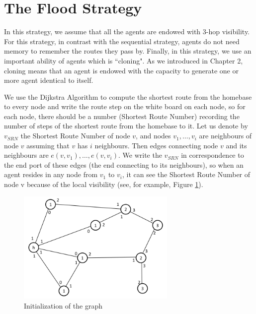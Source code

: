\section{The Flood Strategy}
In this strategy, we assume that all the agents are endowed with 3-hop visibility. For this strategy, in contrast with the sequential strategy, agents   do not need memory to remember the routes they pass by.  Finally, in this strategy, we use an important ability of agents which is ``cloning". As we introduced in Chapter 2, cloning means that an agent is endowed with the capacity to generate one or more agent identical to itself. 

We use the Dijkstra Algorithm to compute the shortest route from the homebase to every node and write the route step on the white board on each node, so for each node, there should be a number (Shortest Route Number) recording the number of steps of the shortest route from the homebase to it. Let us denote by $v_{SRN}$ the Shortest Route Number of node $v$, and nodes ${v_1, \ldots, v_i}$ are neighbours of node $v$ assuming that $v$ has $i$ neighbours. Then edges connecting node $v$ and its neighbours are $e(v, v_1), \ldots, e(v, v_i)$. We write the $v_{SRN}$ in correspondence to the   end port of these edges (the end connecting to its neighbours), so when an agent resides in any node from $v_1$ to $v_i$, it can see the Shortest Route Number of node v because of the local visibility (see, for example,   Figure \ref{fig:Arbi1}).

\begin{figure}[H]
  \centering  
  \includegraphics[width=3in]{figures/Arbi1.png}
  \caption{Initialization of the graph}\label{fig:Arbi1}
\end{figure}

